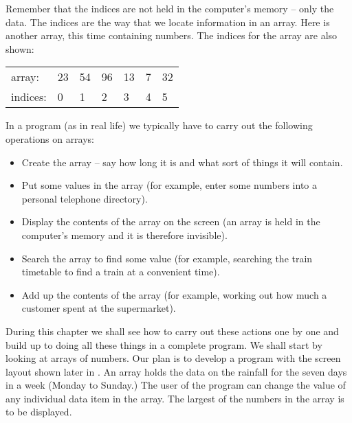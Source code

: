 Remember that the indices are not held in the computer's memory – only the data. The indices are the way that we locate information in an array.
Here is another array, this time containing numbers. The indices for the array are also shown:
		\begin{center}
			\begin{tabular}{l |l|l|l|l|l|l|}
				\cline{2-7}
				array: &	23 &	54 &	96&	13 &	7 &	32 \\ \cline{2-7}
			\multicolumn{1}{l}{indices:} &	\multicolumn{1}{l}{0} &	\multicolumn{1}{l}{1} &	\multicolumn{1}{l}{2}  &	\multicolumn{1}{l}{3} &\multicolumn{1}{l}{4} & \multicolumn{1}{l}{5}  
			\end{tabular}
		\end{center}
		In a program (as in real life) we typically have to carry out the following operations on arrays:
		\begin{itemize}
      \item Create the array – say how long it is and what sort of things it will contain.
      \item Put some values in the array (for example, enter some numbers into a personal telephone directory).
      \item Display the contents of the array on the screen (an array is held in the computer's memory and it is therefore invisible).
      \item Search the array to find some value (for example, searching the train timetable to find a train at a convenient time).
      \item Add up the contents of the array (for example, working out how much a customer spent at the supermarket).
		\end{itemize}
		During this chapter we shall see how to carry out these actions one by one and build up to doing all these things in a complete program. We shall start by looking at arrays of numbers. Our plan is to develop a program with the screen layout shown later in . An array holds the data on the rainfall for the seven days in a week (Monday to Sunday.) The user of the program can change the value of any individual data item in the array. The largest of the numbers in the array is to be displayed.


